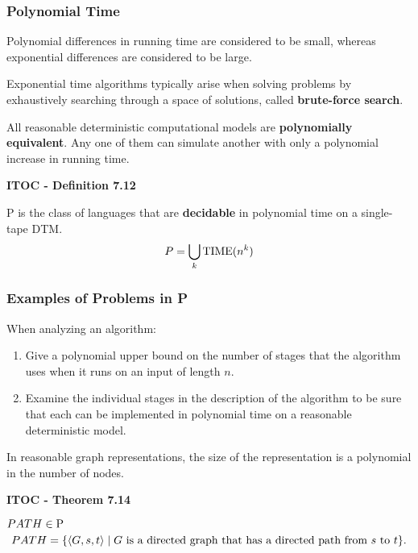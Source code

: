 \subsubsection{Polynomial Time}

Polynomial differences in running time are considered to be small, whereas exponential differences are considered to be large.

Exponential time algorithms typically arise when solving problems by exhaustively searching through a space of solutions, called \textbf{brute-force search}.

All reasonable deterministic computational models are \textbf{polynomially equivalent}. Any one of them can simulate another with only a polynomial increase in running time.

\begin{shaded}
\textbf{ITOC - Definition 7.12}

\medskip
P is the class of languages that are \textbf{decidable} in polynomial time on a single-tape DTM. 
\[
P = \bigcup_k \TIME(n^k)
\]
\end{shaded}

\subsubsection{Examples of Problems in P}

When analyzing an algorithm:
\begin{enumerate}
\item Give a polynomial upper bound on the number of stages that the algorithm uses when it runs on an input of length $n$.
\item Examine the individual stages in the description of the algorithm to be sure that each can be implemented in polynomial time on a reasonable deterministic model.
\end{enumerate}

In reasonable graph representations, the size of the representation is a polynomial in the number of nodes.

\label{theo:7.14}
\label{lang:PATH_P}
\begin{shaded}
\textbf{ITOC - Theorem 7.14}

\medskip 
$PATH \in \P$
\[
PATH = \{\desc{G, s, t} \mid \text{$G$ is a directed graph that has a directed path from $s$ to $t$}\}.
\]
\end{shaded}

